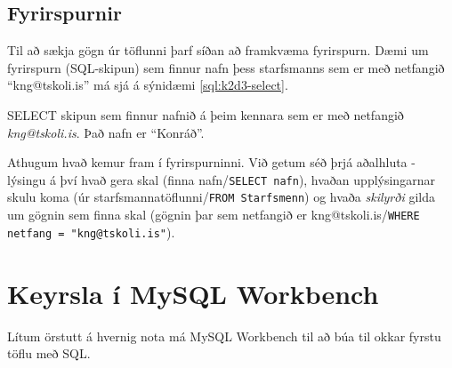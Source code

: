 \subsection{Fyrirspurnir}
Til að sækja gögn úr töflunni þarf síðan að framkvæma fyrirspurn. Dæmi um fyrirspurn (SQL-skipun) sem finnur nafn þess starfsmanns sem er með netfangið ``kng@tskoli.is'' má sjá á sýnidæmi \ref{sql:k2d3-select}.

\begin{example}[h]
\caption{SELECT skipun sem finnur nafnið á þeim kennara sem er með netfangið \emph{kng@tskoli.is}. Það nafn er ``Konráð''.}
\label{sql:k2d3-select}
\centering
{}
\end{example}

Athugum hvað kemur fram í fyrirspurninni. Við getum séð þrjá aðalhluta - lýsingu á því hvað gera skal (finna nafn/\verb|SELECT nafn|), hvaðan upplýsingarnar skulu koma (úr starfsmannatöflunni/\verb|FROM Starfsmenn|) og hvaða \emph{skilyrði} gilda um gögnin sem finna skal (gögnin þar sem netfangið er kng@tskoli.is/\verb|WHERE netfang = "kng@tskoli.is"|). 

\section{Keyrsla í MySQL Workbench}
\label{undirkafli:keyrsla-i-workbench}
Lítum örstutt á hvernig nota má MySQL Workbench til að búa til okkar fyrstu töflu með SQL.

